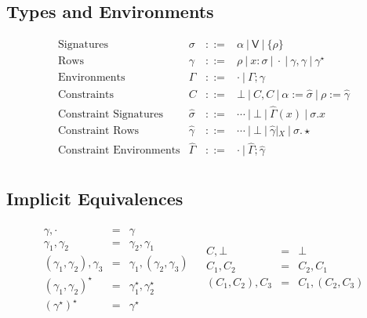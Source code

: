 \documentclass[10pt,a4paper]{article}
\newcommand\y[1]{\ensuremath{\mathsf{#1}}\xspace}
\begin{document}
\subsection*{Types and Environments}
$$
\begin{array}{lrcl}
\mbox{Signatures} & \sigma &::=& \alpha ~|~ \y{V} ~|~ \{\rho\} \\
\mbox{Rows} & \gamma &::=& \rho ~|~ x{:}\sigma ~|~ {\cdot} ~|~ \gamma,\gamma ~|~ \gamma^\star \\
\mbox{Environments} & \Gamma &::=& {\cdot} ~|~ \Gamma;\gamma \\
[1ex]
\mbox{Constraints} & C &::=& \bot ~|~ C,C ~|~ \alpha{:=}\hat\sigma ~|~ \rho{:=}\hat\gamma \\
\mbox{Constraint Signatures} & \hat\sigma &::=& \cdots ~|~ \bot ~|~ \hat\Gamma(x) ~|~ \sigma.x \\
\mbox{Constraint Rows} & \hat\gamma &::=& \cdots ~|~ \bot ~|~ \hat\gamma|_X ~|~ \sigma.{\star} \\
\mbox{Constraint Environments} & \hat\Gamma &::=& \cdot ~|~ \hat\Gamma;\hat\gamma \\
\end{array}
$$

\subsection*{Implicit Equivalences}
$$
\begin{array}{ll}
\begin{array}{rcl}
\gamma,\cdot &=& \gamma \\
\gamma_1,\gamma_2 &=& \gamma_2,\gamma_1 \\
(\gamma_1,\gamma_2),\gamma_3 &=& \gamma_1,(\gamma_2,\gamma_3) \\
(\gamma_1,\gamma_2)^\star &=& \gamma_1^\star,\gamma_2^\star \\
(\gamma^\star)^\star &=& \gamma^\star \\
\end{array}
&
\begin{array}{rcl}
C,\bot &=& \bot \\
C_1,C_2 &=& C_2,C_1 \\
(C_1,C_2),C_3 &=& C_1,(C_2,C_3) \\
~\\
~%
\end{array}
\end{array}
$$
\end{document}
